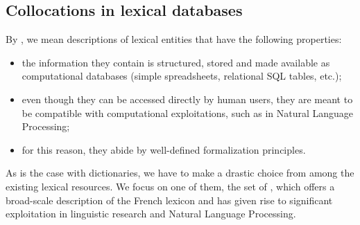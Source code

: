 \subsection{Collocations in lexical databases}\label{sec:collocationsInLexicalDB}

\noindent
By , we mean descriptions of lexical entities that have the following properties:

\begin{itemize}

\item the information they contain is structured, stored and made available as computational databases (simple spreadsheets, relational SQL tables, etc.);

\item even though they can be accessed directly by human users, they are meant to be compatible with computational exploitations, such as in Natural Language Processing;

\item for this reason, they abide by well-defined formalization principles.

\end{itemize}

As is the case with dictionaries, we have to make a drastic choice from among the existing lexical resources. We focus on one of them, the set of , which offers a broad-scale description of the French lexicon and has given rise to significant exploitation in linguistic research and Natural Language Processing.

